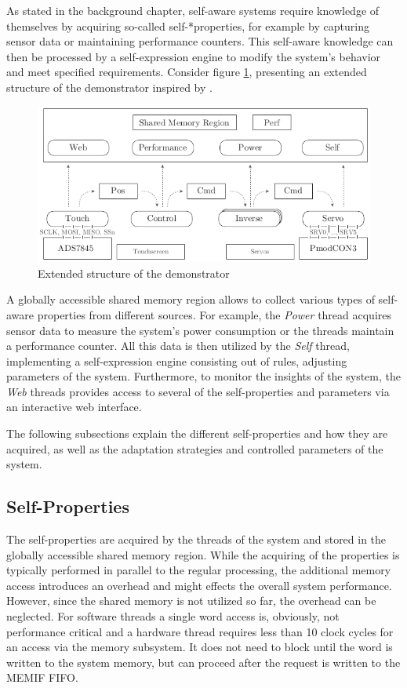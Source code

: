 As stated in the background chapter, self-aware systems require knowledge of
themselves by acquiring so-called self-*properties, for example by capturing
sensor data or maintaining performance counters. This self-aware knowledge can
then be processed by a self-expression engine to modify the system's behavior
and meet specified requirements. Consider figure \ref{fig:demo_selfaware},
presenting an extended structure of the demonstrator inspired by
\citep{AHL14}.
\begin{figure}
	\centering
	\includegraphics{../figures/demo_selfaware}
	\caption{Extended structure of the demonstrator}
	\label{fig:demo_selfaware}
\end{figure}
A globally accessible shared memory region allows to collect various types of
self-aware properties from different sources. For example, the \emph{Power}
thread acquires sensor data to measure the system's power consumption or the
threads maintain a performance counter. All this data is then utilized by the
\emph{Self} thread, implementing a self-expression engine consisting out of
rules, adjusting parameters of the system. Furthermore, to monitor the
insights of the system, the \emph{Web} threads provides access to several of
the self-properties and parameters via an interactive web interface.

The following subsections explain the different self-properties and how they
are acquired, as well as the adaptation strategies and controlled parameters
of the system.

\subsection{Self-Properties}

The self-properties are acquired by the threads of the system and stored in
the globally accessible shared memory region. While the acquiring of the
properties is typically performed in parallel to the regular processing, the
additional memory access introduces an overhead and might effects the
overall system performance. However, since the shared memory is not utilized
so far, the overhead can be neglected. For software threads a
single word access is, obviously, not performance critical and a hardware
thread requires less than 10 clock cycles for an access via the memory
subsystem. It does not need to block until the word is written to the system
memory, but can proceed after the request is written to the \ac{MEMIF}
\ac{FIFO}.

